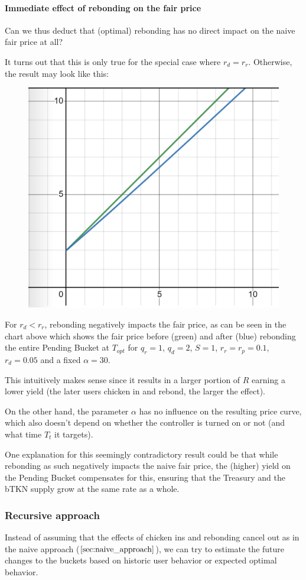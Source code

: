 \documentclass{article}
\begin{document}
\pagebreak

\paragraph{Immediate effect of rebonding on the fair price}
Can we thus deduct that (optimal) rebonding has no direct impact on the naive fair price at all?

It turns out that this is only true for the special case where $r_d = r_r$. Otherwise, the result may look like this:

\begin{figure}[h]
    \centering
    \includegraphics[width=0.5\linewidth]{./ChickenBonds_Whitepaper_rebonding.png}
\end{figure}

For $r_d < r_r$, rebonding negatively impacts the fair price, as can be seen in the chart above which shows the fair price before (green) and after (blue) rebonding the entire Pending Bucket at $T_{opt}$ for $q_r=1$, $q_d=2$, $S=1$, $r_r=r_p=0.1$, $r_d=0.05$ and a fixed $\alpha=30$. 

This intuitively makes sense since it results in a larger portion of $R$ earning a lower yield (the later users chicken in and rebond, the larger the effect). 

On the other hand, the parameter $\alpha$ has no influence on the resulting price curve, which also doesn't depend on whether the controller is turned on or not (and what time $T_t$ it targets).

One explanation for this seemingly contradictory result could be that while rebonding as such negatively impacts the naive fair price, the (higher) yield on the Pending Bucket compensates for this, ensuring that the Treasury and the bTKN supply grow at the same rate as a whole.

\subsubsection{Recursive approach}
Instead of assuming that the effects of chicken ins and rebonding cancel out as in the naive approach ($\ref{sec:naive_approach}$), we can try to estimate the future changes to the buckets based on historic user behavior or expected optimal behavior.
\end{document}
